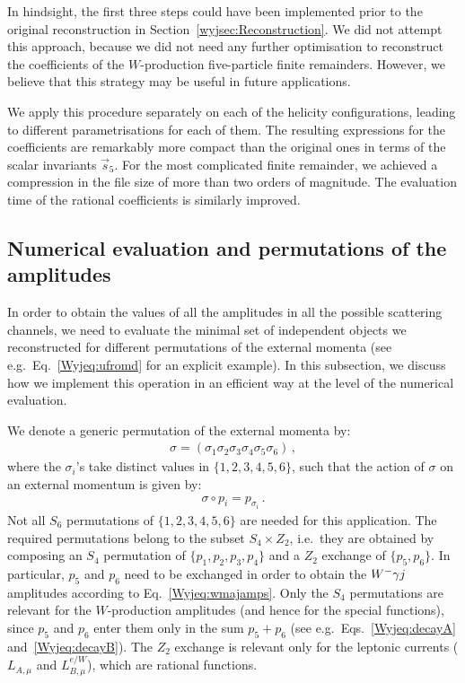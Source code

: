 \documentclass[main.tex]{subfiles}
\begin{document}
In hindsight, the first three steps could have been implemented prior to the original reconstruction in Section~\ref{wyjsec:Reconstruction}. We did not attempt this approach, because we did not need any further optimisation to reconstruct the coefficients of the $W$-production five-particle finite remainders. However, we believe that this strategy may be useful in future applications.

We apply this procedure separately on each of the helicity configurations, leading to different parametrisations for each of them.
The resulting expressions for the coefficients are remarkably more compact than the original ones in terms of the scalar invariants $\vec{s}_5$. For the most complicated finite remainder, we achieved a compression in the file size of more than two orders of magnitude. The evaluation time of the rational coefficients is similarly improved. 
\subsection{Numerical evaluation and permutations of the amplitudes}
\label{wyjsec:Permutations}
In order to obtain the values of all the amplitudes in all the possible scattering channels, we need to evaluate the minimal set of independent objects we reconstructed for different permutations of the external momenta (see e.g.\ Eq.~\ref{Wyjeq:ufromd} for an explicit example). In this subsection, we discuss how we implement this operation in an efficient way at the level of the numerical evaluation.

We denote a generic permutation of the external momenta by:
\begin{align}
\sigma = \left(\sigma_1 \sigma_2 \sigma_3 \sigma_4\sigma_5 \sigma_6 \right) \,,
\end{align}
where the $\sigma_i$'s take distinct values in $\{1,2,3,4,5,6\}$, such that the action of $\sigma$ on an external momentum is given by:
\begin{align}
\sigma \circ p_i = p_{\sigma_i} \,.
\end{align}
Not all $S_6$ permutations of $\{1,2,3,4,5,6\}$ are needed for this application. The required permutations belong to the subset $S_4 \times Z_2$, i.e.\ 
they are obtained by composing an $S_4$ permutation of $\{p_1,p_2,p_3,p_4\}$ and a $Z_2$ exchange of  $\{p_5,p_6\}$. In particular, $p_5$ and $p_6$ need to be exchanged in order to obtain the $W^-\gamma j$ amplitudes according to Eq.~\ref{Wyjeq:wmajamps}. Only the $S_4$ permutations are relevant for the $W$-production amplitudes (and hence for the special functions), since $p_5$ and $p_6$ enter them only in the sum $p_5+p_6$ (see e.g.\ Eqs.~\ref{Wyjeq:decayA} and~\ref{Wyjeq:decayB}). The $Z_2$ exchange is relevant only for the leptonic currents ($L_{A,\mu}$ and $L^{e/W}_{B,\mu}$), which are rational functions.
\end{document}
